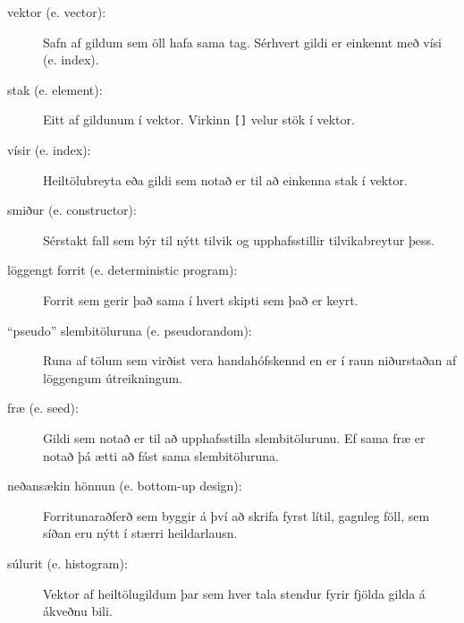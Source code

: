 \begin{description}

\item[vektor (e. vector):]  Safn af gildum sem öll hafa sama tag. Sérhvert gildi er einkennt með vísi (e. index).

\item[stak (e. element):]  Eitt af gildunum í vektor. Virkinn {\tt []} velur stök í vektor.

\item[vísir (e. index):]  Heiltölubreyta eða gildi sem notað er til að einkenna stak í vektor. 

\item[smiður (e. constructor):]  Sérstakt fall sem býr til nýtt tilvik og upphafsstillir tilvikabreytur þess.

\item[löggengt forrit (e. deterministic program):]  Forrit sem gerir það sama í hvert skipti sem það er keyrt.

\item[``pseudo'' slembitöluruna (e. pseudorandom):]  Runa af tölum sem virðist vera handahófskennd en er í raun niðurstaðan af löggengum útreikningum.

\item[fræ (e. seed):]  Gildi sem notað er til að upphafsstilla slembitölurunu.
Ef sama fræ er notað þá ætti að fást sama slembitöluruna.

\item[neðansækin hönnun (e. bottom-up design):]  Forritunaraðferð sem byggir á því að skrifa fyrst lítil, gagnleg föll, sem síðan eru nýtt í stærri heildarlausn.

\item[súlurit (e. histogram):]  Vektor af heiltölugildum þar sem hver tala stendur fyrir fjölda gilda á ákveðnu bili.


\end{description}
